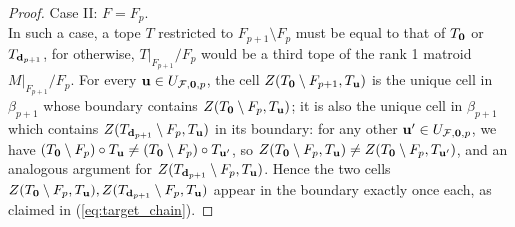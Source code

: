 \documentclass[10pt,a4paper]{amsart}
\newcommand\Fcal{{\mathcal F}}
\newcommand\dd{{\bf d}}
\begin{document}
\begin{proof}
Case II: $F=F_p$.\\
In such a case, a tope $T$ restricted to $F_{p+1}\setminus F_p$ must be equal to that of $T_{\bf 0}$ or $T_{\dd_{p+1}}$, for otherwise, $T|_{F_{p+1}}/F_p$ would be a third tope of the rank 1 matroid $M|_{F_{p+1}}/F_p$.
For every ${\bf u}\in U_{\Fcal,{\bf 0}, p}$, the cell $Z(T_{\bf 0}\setminus F_{p+1},T_{\bf u})$ is the unique cell in $\beta_{p+1}$ whose boundary contains $Z(T_{\bf 0}\setminus F_p,T_{\bf u})$; it is also the unique cell in $\beta_{p+1}$ which contains $Z(T_{\dd_{p+1}}\setminus F_p,T_{\bf u})$ in its boundary: for any other ${\bf u}'\in U_{\Fcal,{\bf 0}, p}$, we have $(T_{\bf 0}\setminus F_p)\circ T_{\bf u}\neq (T_{\bf 0}\setminus F_p)\circ T_{{\bf u}'}$, so $Z(T_{\bf 0}\setminus F_p,T_{\bf u})\neq Z(T_{\bf 0}\setminus F_p,T_{{\bf u}'})$, and an analogous argument for $Z(T_{\dd_{p+1}}\setminus F_p,T_{\bf u})$.
Hence the two cells $Z(T_{\bf 0}\setminus F_p,T_{\bf u}),Z(T_{\dd_{p+1}}\setminus F_p,T_{\bf u})$ appear in the boundary exactly once each, as claimed in (\ref{eq:target_chain}).
\end{proof}
\end{document}
